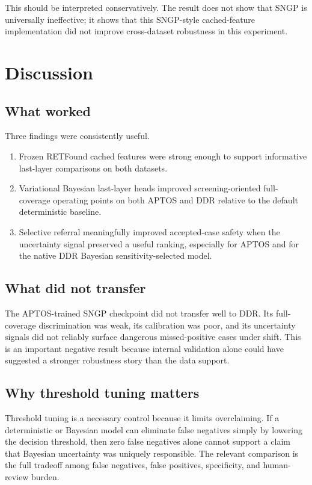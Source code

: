 \documentclass[11pt]{article}
\begin{document}
This should be interpreted conservatively. The result does not show that SNGP is universally ineffective; it shows that this SNGP-style cached-feature implementation did not improve cross-dataset robustness in this experiment.

\FloatBarrier
\section{Discussion}

\subsection{What worked}
Three findings were consistently useful.
\begin{enumerate}[leftmargin=1.2em]
\item Frozen RETFound cached features were strong enough to support informative last-layer comparisons on both datasets.
\item Variational Bayesian last-layer heads improved screening-oriented full-coverage operating points on both APTOS and DDR relative to the default deterministic baseline.
\item Selective referral meaningfully improved accepted-case safety when the uncertainty signal preserved a useful ranking, especially for APTOS and for the native DDR Bayesian sensitivity-selected model.
\end{enumerate}

\subsection{What did not transfer}
The APTOS-trained SNGP checkpoint did not transfer well to DDR. Its full-coverage discrimination was weak, its calibration was poor, and its uncertainty signals did not reliably surface dangerous missed-positive cases under shift. This is an important negative result because internal validation alone could have suggested a stronger robustness story than the data support.

\subsection{Why threshold tuning matters}
Threshold tuning is a necessary control because it limits overclaiming. If a deterministic or Bayesian model can eliminate false negatives simply by lowering the decision threshold, then zero false negatives alone cannot support a claim that Bayesian uncertainty was uniquely responsible. The relevant comparison is the full tradeoff among false negatives, false positives, specificity, and human-review burden.
\end{document}
